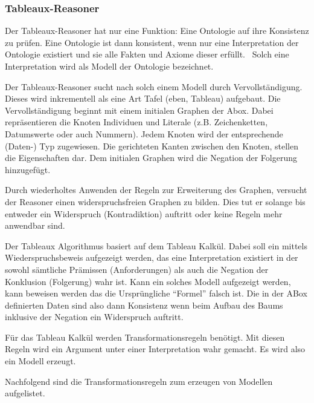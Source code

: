 \subsubsection{Tableaux-Reasoner}
\label{ssubsection:inferenz_pellet_tableaux}
Der Tableaux-Reasoner hat nur eine Funktion: Eine Ontologie auf ihre Konsistenz zu prüfen. Eine Ontologie ist dann konsistent, wenn nur eine Interpretation der Ontologie existiert und sie alle Fakten und Axiome dieser erfüllt.~\cite{w3owlsemantics} Solch eine Interpretation wird als Modell der Ontologie bezeichnet.

Der Tableaux-Reasoner sucht nach solch einem Modell durch Vervollständigung. Dieses wird inkrementell als eine Art Tafel (eben, Tableau) aufgebaut. Die Vervollständigung beginnt mit einem initialen Graphen der Abox. Dabei repräsentieren die Knoten Individuen und Literale (z.B. Zeichenketten, Datumswerte oder auch Nummern). Jedem Knoten wird der entsprechende (Daten-) Typ zugewiesen. Die gerichteten Kanten zwischen den Knoten, stellen die Eigenschaften dar. %
Dem initialen Graphen wird die Negation der Folgerung hinzugefügt.


Durch wiederholtes Anwenden der Regeln zur Erweiterung des Graphen, versucht der Reasoner einen widerspruchsfreien Graphen zu bilden. Dies tut er solange bis entweder ein Widerspruch (Kontradiktion) auftritt oder keine Regeln mehr anwendbar sind.

Der Tableaux Algorithmus basiert auf dem Tableau Kalkül. Dabei soll ein mittels Wiederspruchsbeweis aufgezeigt werden, das eine Interpretation existiert in der sowohl sämtliche Prämissen (Anforderungen) als auch die Negation der Konklusion (Folgerung) wahr ist. Kann ein solches Modell aufgezeigt werden, kann beweisen werden das die Ursprüngliche ``Formel'' falsch ist. Die in der ABox definierten Daten sind also dann Konsistenz wenn beim Aufbau des Baums inklusive der Negation ein Widerspruch auftritt.~\cite{baumkalkuel}

Für das Tableau Kalkül werden Transformationsregeln benötigt. Mit diesen Regeln wird ein Argument unter einer Interpretation wahr gemacht. Es wird also ein Modell erzeugt.\cite{baumkalkuel}

Nachfolgend sind die Transformationsregeln zum erzeugen von Modellen aufgelistet.

